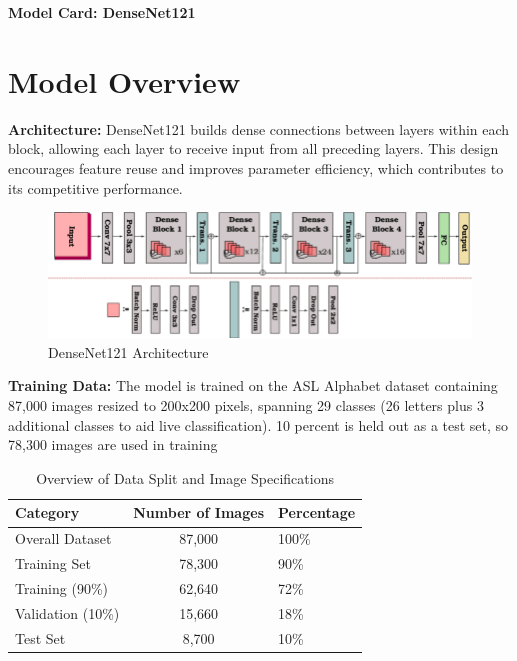 \documentclass[12pt, a4paper]{article}
\begin{document}
\begin{center}
    \Large\textbf{Model Card: DenseNet121}\\[0.3cm]
\end{center}

\section{Model Overview}
\textbf{Architecture:} DenseNet121 builds dense connections between layers within each block, allowing each layer to receive input from all preceding layers. This design encourages feature reuse and improves parameter efficiency, which contributes to its competitive performance.\\[0.3cm]
\begin{figure}[H]
    \centering
    \includegraphics[width=\textwidth]{../../plots/densenet_architecture.png}
    \caption{DenseNet121 Architecture  \cite{denseSparseStateEstimation}}
    \label{fig:resnet18_architecture}
\end{figure}
\textbf{Training Data:} The model is trained on the ASL Alphabet dataset containing 87,000 images resized to 200x200 pixels, spanning 29 classes (26 letters plus 3 additional classes to aid live classification). 10 percent is held out as a test set, so 78,300 images are used in training
\begin{table}[H]
    \centering
    \caption{Overview of Data Split and Image Specifications}
    \label{tab:datasplit}
    \begin{tabular}{|l|cl|}
    \hline
    \textbf{Category} & \textbf{Number of Images} & \textbf{Percentage} \\
    \hline
    Overall Dataset & 87,000 & 100\% \\
    Training Set & 78,300 & 90\% \\
    \quad Training (90\%) & 62,640 & 72\% \\ 
    \quad Validation (10\%) & 15,660 & 18\% \\ 
    Test Set & 8,700 & 10\% \\
    \hline
    \end{tabular}
    \end{table}
\end{document}
